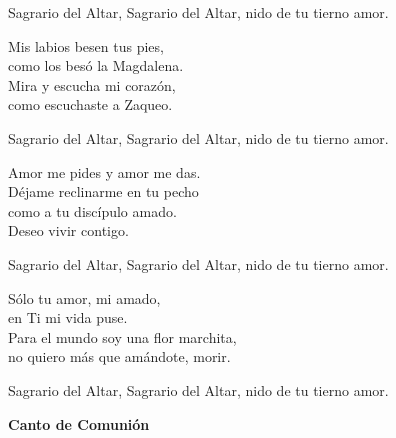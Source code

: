 \documentclass[12pt, letterpaper]{report}
\begin{document}
    \noindent
    Sagrario del Altar, Sagrario del Altar, nido de tu tierno amor.

    \noindent
    Mis labios besen tus pies,\\
    como los bes\'o la Magdalena.\\
    Mira y escucha mi coraz\'on,\\
    como escuchaste a Zaqueo.

    \noindent
    Sagrario del Altar, Sagrario del Altar, nido de tu tierno amor.

    \noindent
    Amor me pides y amor me das.\\
    D\'ejame reclinarme en tu pecho\\
    como a tu disc\'ipulo amado.\\
    Deseo vivir contigo.

    \noindent
    Sagrario del Altar, Sagrario del Altar, nido de tu tierno amor.

    \noindent
    S\'olo tu amor, mi amado,\\
    en Ti mi vida puse.\\
    Para el mundo soy una flor marchita,\\
    no quiero m\'as que am\'andote, morir.

    \noindent
    Sagrario del Altar, Sagrario del Altar, nido de tu tierno amor.
    \clearpage



    
    \begin{center}
        \Huge {\bfseries Canto de Comuni\'on}
    \end{center}
\end{document}
